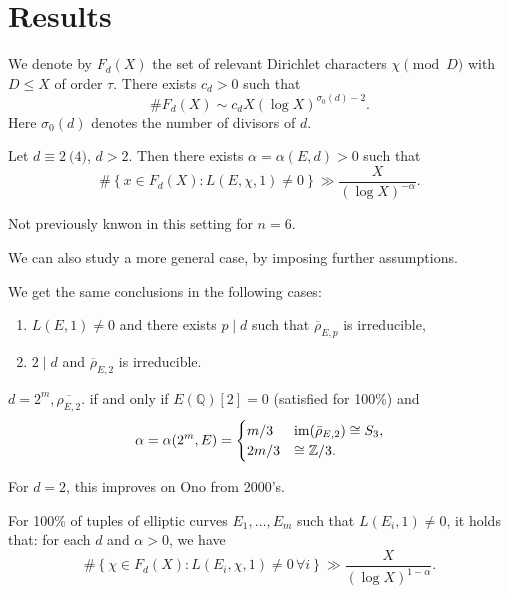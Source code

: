 \documentclass[reqno]{amsart} 
\begin{document}
\section{Results}
We denote by $F_d(X)$ the set of relevant Dirichlet characters $\chi \pmod{D}$ with $D \leq X$ of order $\tau$.  There exists $c_d > 0$ such that
\begin{equation*}
  \# F_d(X) \sim c_d X(\log X)^{\sigma_0(d) - 2}.
\end{equation*}
Here $\sigma_0(d)$ denotes the number of divisors of $d$.
\begin{theorem}
  [Kriz--N 23]
  Let $d \equiv 2\pod{4}$, $d > 2$.  Then there exists $\alpha = \alpha(E, d) > 0$ such that
  \begin{equation*}
    \# \left\{ x \in F_d(X) : L(E, \chi, 1) \neq 0 \right\} \gg \frac{X}{(\log X)^{- \alpha}}.
  \end{equation*}
\end{theorem}
\begin{remark}
  Not previously knwon in this setting for $n=6$.
\end{remark}

We can also study a more general case, by imposing further assumptions.
\begin{theorem}
  We get the same conclusions in the following cases:
  \begin{enumerate}
  \item $L(E, 1) \neq 0$ and there exists $p \mid d$ such that $\overline{\rho}_{E, p}$ is irreducible,
  \item $2 \mid d$ and $\overline{\rho}_{E, 2}$ is irreducible.
  \end{enumerate}  
\end{theorem}


\begin{remark}
  $d = 2^m, \overline{\rho_{E, 2}}$. if and only if $E(\mathbb{Q})[2] = 0$ (satisfied for 100\%) and
  \begin{equation*}
      \alpha = \alpha(2^m, E)
      =
      \begin{cases}
        m/3        & \operatorname{im}(\bar{\rho}_{E, 2}) \cong S_3, \\
        2 m / 3                   &   \cong \mathbb{Z}/3.
      \end{cases}
    \end{equation*}
\end{remark}


For $d = 2$, this improves on Ono from 2000's.

\begin{theorem}
  For 100\% of tuples of elliptic curves $E_1, \dotsc, E_m$ such that $L(E_i, 1) \neq 0$, it holds that: for each $d$ and $\alpha > 0$, we have
  \begin{equation*}
    \# \left\{ \chi \in F_d(X) : L(E_i, \chi, 1) \neq 0 \,\forall i \right\} \gg \frac{X}{(\log X)^{1 - \alpha}}.
  \end{equation*}
\end{theorem}
\end{document}
